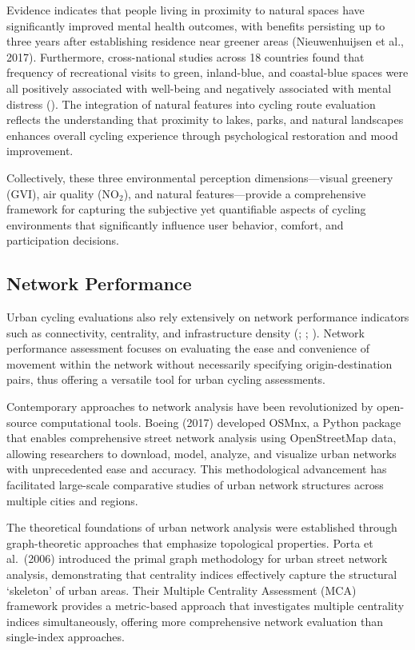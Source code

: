 \documentclass[
  12pt,
  oneside]{book}
\begin{document}
Evidence indicates that people living in proximity to natural spaces have significantly improved mental health outcomes, with benefits persisting up to three years after establishing residence near greener areas (Nieuwenhuijsen et al., 2017). Furthermore, cross-national studies across 18 countries found that frequency of recreational visits to green, inland-blue, and coastal-blue spaces were all positively associated with well-being and negatively associated with mental distress (\textcite{hooyberg_general_2020}). The integration of natural features into cycling route evaluation reflects the understanding that proximity to lakes, parks, and natural landscapes enhances overall cycling experience through psychological restoration and mood improvement.

Collectively, these three environmental perception dimensions---visual greenery (GVI), air quality (NO\(_2\)), and natural features---provide a comprehensive framework for capturing the subjective yet quantifiable aspects of cycling environments that significantly influence user behavior, comfort, and participation decisions.

\subsection{Network Performance}\label{network-performance}

Urban cycling evaluations also rely extensively on network performance indicators such as connectivity, centrality, and infrastructure density (\textcite{lowry_assessment_2012}; \textcite{geurs_multi-modal_2016}; \textcite{buehler_bikeway_2016}). Network performance assessment focuses on evaluating the ease and convenience of movement within the network without necessarily specifying origin-destination pairs, thus offering a versatile tool for urban cycling assessments.

Contemporary approaches to network analysis have been revolutionized by open-source computational tools. Boeing (2017) developed OSMnx, a Python package that enables comprehensive street network analysis using OpenStreetMap data, allowing researchers to download, model, analyze, and visualize urban networks with unprecedented ease and accuracy. This methodological advancement has facilitated large-scale comparative studies of urban network structures across multiple cities and regions.

The theoretical foundations of urban network analysis were established through graph-theoretic approaches that emphasize topological properties. Porta et al.~(2006) introduced the primal graph methodology for urban street network analysis, demonstrating that centrality indices effectively capture the structural `skeleton' of urban areas. Their Multiple Centrality Assessment (MCA) framework provides a metric-based approach that investigates multiple centrality indices simultaneously, offering more comprehensive network evaluation than single-index approaches.
\end{document}

